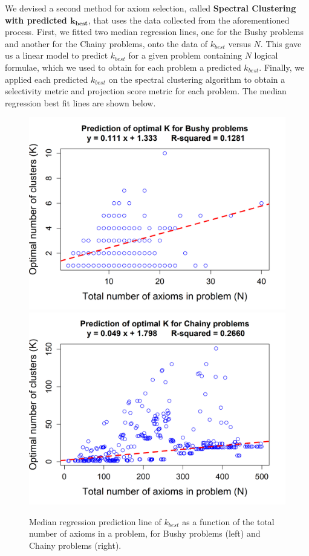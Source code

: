 \documentclass[EPiC]{easychair}
\begin{document}
We devised a second method for axiom selection, called 
\textbf{Spectral Clustering with predicted $\mathbf{k_{best}}$}, that uses 
the data collected from the aforementioned process. First, we fitted two
median regression lines, one for the Bushy problems and another for the 
Chainy problems, onto the data of $k_{best}$ versus $N$. This gave us a 
linear model to predict $k_{best}$ for a given problem containing $N$
logical formulae, which we used to obtain for each problem a predicted
$k_{best}$. Finally, we applied each predicted $k_{best}$ on the spectral
clustering algorithm to obtain a selectivity metric and projection score
metric for each problem. The median regression best fit lines are shown 
below.
\begin{figure}[H]
	\centering
 	\includegraphics[scale=0.42]{median-regression-optimal-k-bushy.png}
	\includegraphics[scale=0.42]{median-regression-optimal-k-chainy.png}
	\vspace{1mm}
	\caption{ Median regression prediction line of $k_{best}$ as a function 
	of the total number of axioms in a problem, for Bushy problems (left) 
	and Chainy problems (right). }
	\label{fig:median-regression}
\end{figure}
\end{document}
